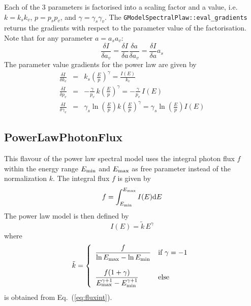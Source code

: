 \documentclass{article}[12pt,a4]
\begin{document}
Each of the 3 parameters is factorised into a scaling factor and a value, i.e.
$k=k_s k_v$, $p=p_s p_v$, and $\gamma = \gamma_s \gamma_v$.
The {\tt GModelSpectralPlaw::eval\_gradients} returns the gradients with
respect to the parameter value of the factorisation.
Note that for any parameter $a=a_s a_v$:
\begin{equation}
\frac{\delta I}{\delta a_v} = \frac{\delta I}{\delta a} \frac{\delta a}{\delta a_v} =
  \frac{\delta I}{\delta a} a_s
\end{equation}
The parameter value gradients for the power law are given by
\begin{eqnarray}
\frac{\delta I}{\delta k_v} & = & 
  k_s \left( \frac{E}{p} \right)^{\gamma} = \frac{I(E)}{k_v} \\
\frac{\delta I}{\delta p_v} & = & 
  -\frac{\gamma}{p_v} \, k \left( \frac{E}{p} \right)^{\gamma} =
  -\frac{\gamma}{p_v} \, I(E) \\
\frac{\delta I}{\delta \gamma_v} & = &
  \gamma_s \ln \left( \frac{E}{p} \right) k \left( \frac{E}{p} \right)^{\gamma} =
  \gamma_s \ln \left( \frac{E}{p} \right) I(E)
\end{eqnarray}


\subsection{PowerLawPhotonFlux}

This flavour of the power law spectral model uses the integral photon flux $f$ within the
energy range $E_{\rm min}$ and $E_{\rm max}$ as free parameter instead of
the normalization $k$.
The integral flux $f$ is given by
\begin{equation}
f = \int_{E_{\rm min}}^{E_{\rm max}} I(E) {\rm d}E
\label{eq:fluxint}
\end{equation}
The power law model is then defined by
\begin{equation}
I(E) = \tilde{k} \, E^{\gamma}
\end{equation}
where
\begin{equation}
   \tilde{k} = \left \{
   \begin{array}{l l}
      \displaystyle
      \frac{f}{\ln E_{\rm max} - \ln E_{\rm min}} 
        & \mbox{if $\gamma = -1$} \\
     \\
     \displaystyle
      \frac{f (1+\gamma)}{E_{\rm max}^{\gamma+1}-E_{\rm min}^{\gamma+1}} 
        & \mbox{else}
   \end{array}
   \right .
\end{equation}
is obtained from Eq.~(\ref{eq:fluxint}).
\end{document}
